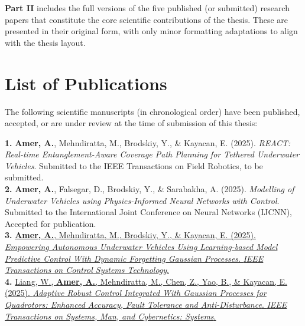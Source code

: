 \textbf{Part II} includes the full versions of the five published (or submitted) research papers that constitute the core scientific contributions of the thesis. These are presented in their original form, with only minor formatting adaptations to align with the thesis layout.







\section*{List of Publications}
The following scientific manuscripts (in chronological order) have been published, accepted, or are under review at the time of submission of this thesis:

\vspace{1em}



\textbf{1.} \textbf{Amer, A.}, Mehndiratta, M., Brodskiy, Y., \& Kayacan, E. (2025). \textit{REACT: Real-time Entanglement-Aware Coverage Path Planning for Tethered Underwater Vehicles}. Submitted to the IEEE Transactions on Field Robotics, to be submitted.\\[0.8em]

\textbf{2.} \textbf{Amer, A.}, Falsegar, D., Brodskiy, Y., \& Sarabakha, A. (2025). \textit{Modelling of Underwater Vehicles using Physics-Informed Neural Networks with Control}. Submitted to the International Joint Conference on Neural Networks (IJCNN), Accepted for publication.\\[0.8em]

\textbf{3.} \href{https://ieeexplore.ieee.org/document/10916556/authors#authors}{\textbf{Amer, A.}, Mehndiratta, M., Brodskiy, Y., \& Kayacan, E. (2025). \textit{Empowering Autonomous Underwater Vehicles Using Learning-based Model Predictive Control With Dynamic Forgetting Gaussian Processes}. \textit{IEEE Transactions on Control Systems Technology}.}\\[0.8em]

\textbf{4.} \href{https://ieeexplore.ieee.org/document/10900576}{Liang, W., \textbf{Amer, A.}, Mehndiratta, M., Chen, Z., Yao, B., \& Kayacan, E. (2025). \textit{Adaptive Robust Control Integrated With Gaussian Processes for Quadrotors: Enhanced Accuracy, Fault Tolerance and Anti-Disturbance}. \textit{IEEE Transactions on Systems, Man, and Cybernetics: Systems}.}\\[0.8em]

